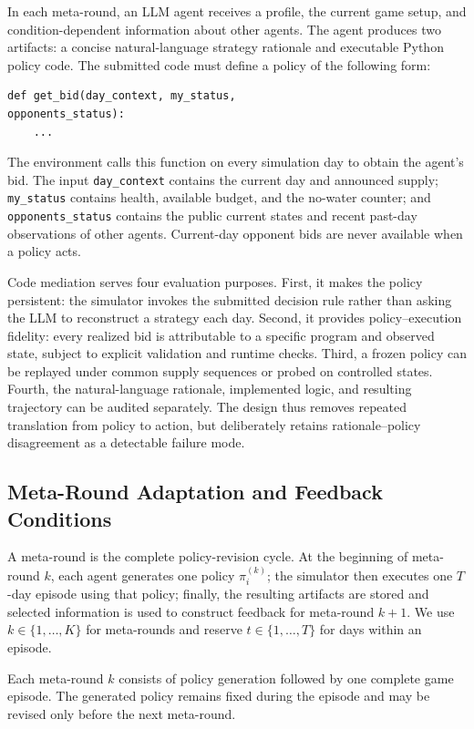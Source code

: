 \documentclass[letterpaper]{article} %
\begin{document}
In each meta-round, an LLM agent receives a profile, the current game setup, and condition-dependent information about other agents. The agent produces two artifacts: a concise natural-language strategy rationale and executable Python policy code. The submitted code must define a policy of the following form:

\begin{verbatim}
def get_bid(day_context, my_status, 
opponents_status):
    ...
\end{verbatim}

The environment calls this function on every simulation day to obtain the
agent's bid. The input \texttt{day\_context} contains the current day and
announced supply; \texttt{my\_status} contains health, available budget, and
the no-water counter; and \texttt{opponents\_status} contains the public
current states and recent past-day observations of other agents. Current-day
opponent bids are never available when a policy acts.

Code mediation serves four evaluation purposes. First, it makes the policy
persistent: the simulator invokes the submitted decision rule rather than
asking the LLM to reconstruct a strategy each day. Second, it provides
policy--execution fidelity: every realized bid is attributable to a specific
program and observed state, subject to explicit validation and runtime checks.
Third, a frozen policy can be replayed under common supply sequences or probed
on controlled states. Fourth, the natural-language rationale, implemented
logic, and resulting trajectory can be audited separately. The design thus
removes repeated translation from policy to action, but deliberately retains
rationale--policy disagreement as a detectable failure mode.

\subsection{Meta-Round Adaptation and Feedback Conditions}
A meta-round is the complete policy-revision cycle. At the
beginning of meta-round $k$, each agent generates one policy
$\pi_i^{(k)}$; the simulator then executes one $T$-day episode
using that policy; finally, the resulting artifacts are stored
and selected information is used to construct feedback for
meta-round $k+1$. We use $k\in\{1,\ldots,K\}$ for meta-rounds
and reserve $t\in\{1,\ldots,T\}$ for days within an episode.

Each meta-round $k$ consists of policy generation followed by
one complete game episode. The generated policy remains fixed
during the episode and may be revised only before the next
meta-round.
\end{document}

